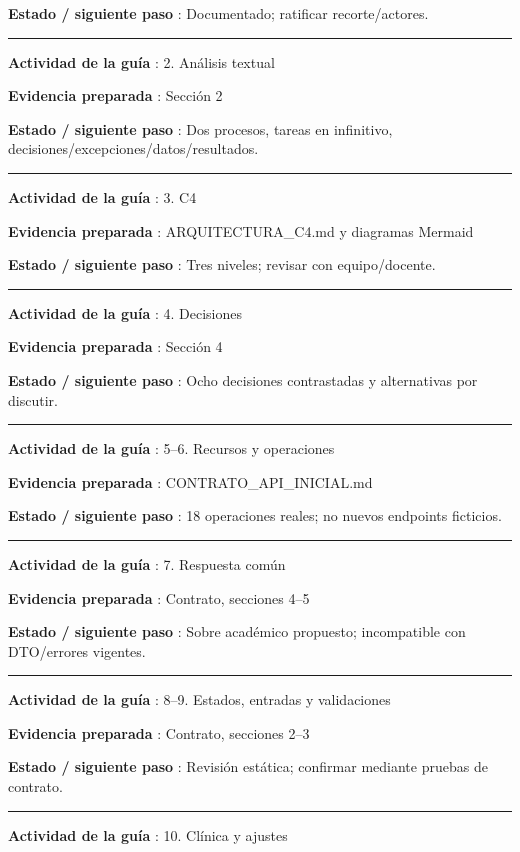 \documentclass[12pt,a4paper]{report}
\begin{document}
\textbf{Estado / siguiente paso }: Documentado; ratificar
recorte/actores.

\medskip\hrule\medskip

\textbf{Actividad de la guía }: 2. Análisis textual

\textbf{Evidencia preparada }: Sección 2

\textbf{Estado / siguiente paso }: Dos procesos, tareas en infinitivo,
decisiones/excepciones/datos/resultados.

\medskip\hrule\medskip

\textbf{Actividad de la guía }: 3. C4

\textbf{Evidencia preparada }: ARQUITECTURA\_C4.md y diagramas Mermaid

\textbf{Estado / siguiente paso }: Tres niveles; revisar con
equipo/docente.

\medskip\hrule\medskip

\textbf{Actividad de la guía }: 4. Decisiones

\textbf{Evidencia preparada }: Sección 4

\textbf{Estado / siguiente paso }: Ocho decisiones contrastadas y
alternativas por discutir.

\medskip\hrule\medskip

\textbf{Actividad de la guía }: 5--6. Recursos y operaciones

\textbf{Evidencia preparada }: CONTRATO\_API\_INICIAL.md

\textbf{Estado / siguiente paso }: 18 operaciones reales; no nuevos
endpoints ficticios.

\medskip\hrule\medskip

\textbf{Actividad de la guía }: 7. Respuesta común

\textbf{Evidencia preparada }: Contrato, secciones 4--5

\textbf{Estado / siguiente paso }: Sobre académico propuesto;
incompatible con DTO/errores vigentes.

\medskip\hrule\medskip

\textbf{Actividad de la guía }: 8--9. Estados, entradas y validaciones

\textbf{Evidencia preparada }: Contrato, secciones 2--3

\textbf{Estado / siguiente paso }: Revisión estática; confirmar mediante
pruebas de contrato.

\medskip\hrule\medskip

\textbf{Actividad de la guía }: 10. Clínica y ajustes
\end{document}

